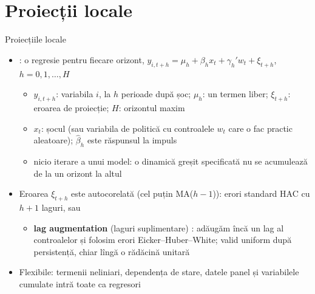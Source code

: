 \section{Proiecții locale}

\begin{frame}{Proiecțiile locale}
\itemsize{\small}
\begin{itemize}
    \item {}: o regresie pentru fiecare orizont, $y_{i,t+h} = \mu_h + \beta_hx_t + \gamma_h'w_t + \xi_{t+h}$, $h = 0, 1, \dots, H$
    \begin{itemize}
        \item $y_{i,t+h}$: variabila $i$, la $h$ perioade după șoc; $\mu_h$: un termen liber; $\xi_{t+h}$: eroarea de proiecție; $H$: orizontul maxim
        \item $x_t$: șocul (sau variabila de politică cu controalele $w_t$ care o fac practic aleatoare); $\hat\beta_h$ este răspunsul la impuls
        \item nicio iterare a unui model: o dinamică greșit specificată nu se acumulează de la un orizont la altul
    \end{itemize}
    \item Eroarea $\xi_{t+h}$ este autocorelată (cel puțin MA($h - 1$)): erori standard HAC cu $h + 1$ laguri, sau
    \begin{itemize}
        \item \textbf{lag augmentation} (laguri suplimentare) : adăugăm încă un lag al controalelor și folosim erori Eicker--Huber--White; valid uniform după persistență, chiar lîngă o rădăcină unitară
    \end{itemize}
    \item Flexibile: termenii neliniari, dependența de stare, datele panel și variabilele cumulate intră toate ca regresori
\end{itemize}
\end{frame}

